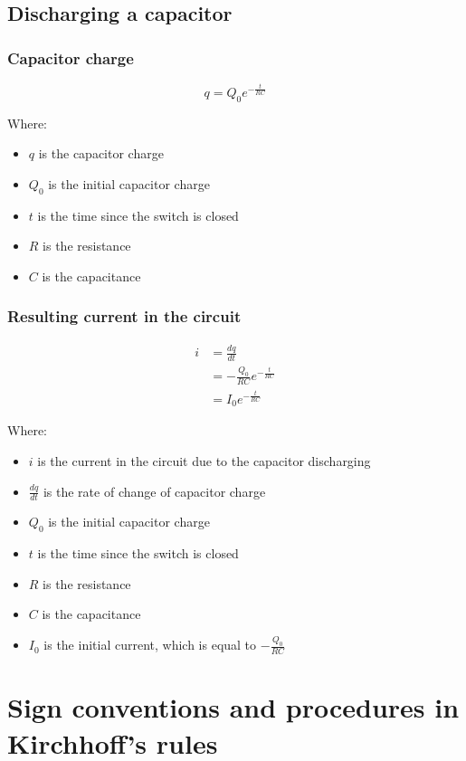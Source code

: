 \documentclass[11pt]{article}
\begin{document}
\subsection{Discharging a capacitor}
\label{sec:org191c1f6}

\subsubsection{Capacitor charge}
\label{sec:orge32d704}
\[q = Q_0 e^{-\frac{t}{RC}}\]

Where:
\begin{itemize}
\item \(q\) is the capacitor charge
\item \(Q_0\) is the initial capacitor charge
\item \(t\) is the time since the switch is closed
\item \(R\) is the resistance
\item \(C\) is the capacitance
\end{itemize}
\subsubsection{Resulting current in the circuit}
\label{sec:org9ee6ae5}
\begin{align*}
i &= \frac{dq}{dt} \\
&= - \frac{Q_0}{RC} e^{-\frac{t}{RC}} \\
&= I_0 e^{- \frac{t}{RC}}
\end{align*}

Where:
\begin{itemize}
\item \(i\) is the current in the circuit due to the capacitor discharging
\item \(\frac{dq}{dt}\) is the rate of change of capacitor charge
\item \(Q_0\) is the initial capacitor charge
\item \(t\) is the time since the switch is closed
\item \(R\) is the resistance
\item \(C\) is the capacitance
\item \(I_0\) is the initial current, which is equal to \(- \frac{Q_0}{RC}\)
\end{itemize}
\section{Sign conventions and procedures in Kirchhoff's rules}
\label{sec:orgef26f7b}
\end{document}
